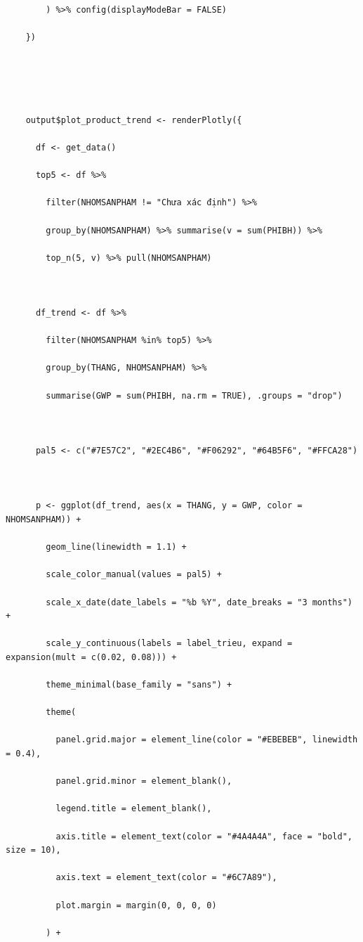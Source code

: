 \documentclass[12pt, a4paper]{article}
\begin{document}
\begin{lstlisting}
        ) %>% config(displayModeBar = FALSE)

    })





    output$plot_product_trend <- renderPlotly({

      df <- get_data()

      top5 <- df %>%

        filter(NHOMSANPHAM != "Chưa xác định") %>%

        group_by(NHOMSANPHAM) %>% summarise(v = sum(PHIBH)) %>%

        top_n(5, v) %>% pull(NHOMSANPHAM)



      df_trend <- df %>%

        filter(NHOMSANPHAM %in% top5) %>%

        group_by(THANG, NHOMSANPHAM) %>%

        summarise(GWP = sum(PHIBH, na.rm = TRUE), .groups = "drop")



      pal5 <- c("#7E57C2", "#2EC4B6", "#F06292", "#64B5F6", "#FFCA28")



      p <- ggplot(df_trend, aes(x = THANG, y = GWP, color = NHOMSANPHAM)) +

        geom_line(linewidth = 1.1) +

        scale_color_manual(values = pal5) +

        scale_x_date(date_labels = "%b %Y", date_breaks = "3 months") +

        scale_y_continuous(labels = label_trieu, expand = expansion(mult = c(0.02, 0.08))) +

        theme_minimal(base_family = "sans") +

        theme(

          panel.grid.major = element_line(color = "#EBEBEB", linewidth = 0.4),

          panel.grid.minor = element_blank(),

          legend.title = element_blank(),

          axis.title = element_text(color = "#4A4A4A", face = "bold", size = 10),

          axis.text = element_text(color = "#6C7A89"),

          plot.margin = margin(0, 0, 0, 0)

        ) +


\end{lstlisting}
\end{document}
